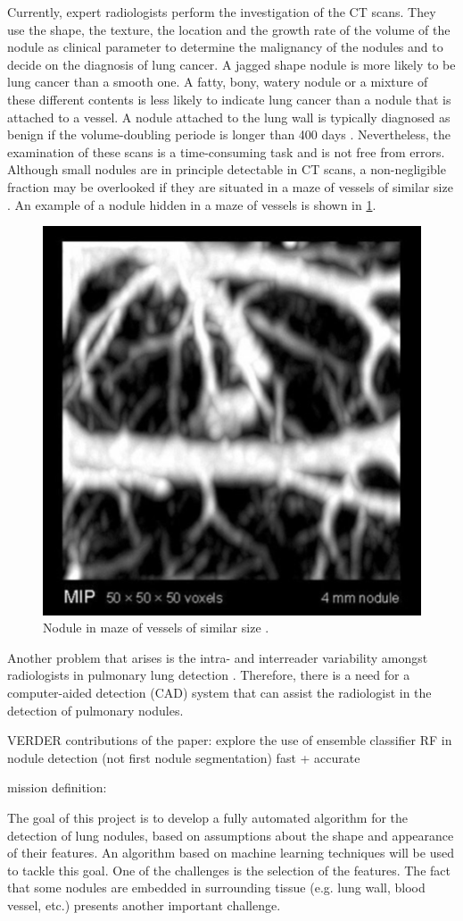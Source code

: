 Currently, expert radiologists perform the investigation of the
CT scans. They use the shape, the texture, the location and the growth rate of
the volume of the nodule as clinical parameter to determine the malignancy of
the nodules and to decide on the diagnosis of lung cancer. A jagged shape
nodule is more likely to be lung cancer than a smooth one. A fatty, bony,
watery nodule or a mixture of these different contents is less likely to
indicate lung cancer than a nodule that is attached to a vessel. A nodule
attached to the lung wall is typically diagnosed as benign if the
volume-doubling periode is longer than 400 days \cite{wu}. Nevertheless, the
examination of these scans is a time-consuming task and is not free from errors.
Although small nodules are in principle detectable in CT scans, a non-negligible
fraction may be overlooked if they are situated in a maze of vessels of similar
size \cite{ozekes}. An example of a nodule hidden in a maze of vessels is shown
in \ref{nodmaze}.
\begin{figure}[htp]
\begin{center}
  \includegraphics[width= 30 mm]{img/noduleMaze.png}
  \caption{Nodule in maze of vessels of similar size \cite{noduleMaze}.}
  \label{nodmaze}
\end{center}
\end{figure}
Another problem that arises is the intra- and interreader variability
amongst radiologists in pulmonary lung detection \cite{armato} \cite{hens}. Therefore,
there is a need for a computer-aided detection (CAD) system that can assist the
radiologist in the detection of pulmonary nodules.

VERDER
contributions of the paper: explore the use of ensemble classifier RF in nodule detection (not first nodule
segmentation)
fast + accurate


mission definition:

The goal of this project is to develop a fully automated algorithm for the
detection of lung nodules, based on assumptions about the shape and appearance of their
features. An algorithm based on machine learning techniques will be used to
tackle this goal. One of the challenges is the selection of the features. The
fact that some nodules are embedded in surrounding tissue (e.g.
lung wall, blood vessel, etc.) presents another important challenge.



